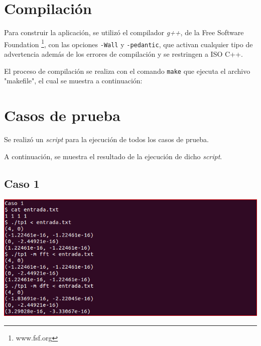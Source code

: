 \documentclass{article}
\begin{document}
\section{Compilación}
    Para construir la aplicación, se utilizó el compilador \textit{g++}, 
  de la Free Software Foundation \footnote{www.fsf.org}, con las opciones
  \texttt{-Wall} y \texttt{-pedantic}, que activan cualquier tipo de advertencia
  además de los errores de compilación y se restringen a ISO C++. \par
    El proceso de compilación se realiza con el comando \texttt{make} que 
  ejecuta el archivo "makefile", el cual se muestra a continuación:
  

\section{Casos de prueba}

  Se realizó un \textit{script} para la ejecución de todos los casos de prueba.
   \par
    A continuación, se muestra el resultado de la ejecución de dicho \textit{script}.
  \subsection{Caso 1}
    \begin{center}
      \includegraphics[width=0.8\paperwidth]{Imagenes/caso_1}
    \end{center}
\end{document}
